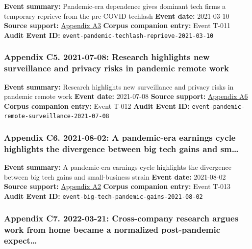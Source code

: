 \documentclass[
  american,
  11pt,
  letterpaper,
]{article}
\begin{document}
\textbf{Event summary:} Pandemic-era dependence gives dominant tech
firms a temporary reprieve from the pre-COVID techlash \textbf{Event
date:} 2021-03-10 \textbf{Source support:}
\hyperref[appendix-a3-pandemic-provides-a-techlash-reprieve]{Appendix
A3} \textbf{Corpus companion entry:} Event T-011 \textbf{Audit Event
ID:} \texttt{event-pandemic-techlash-reprieve-2021-03-10}

\subsubsection{Appendix C5. 2021-07-08: Research highlights new
surveillance and privacy risks in pandemic remote
work}\label{appendix-c5-2021-07-08-research-highlights-new-surveillance-and-privacy-risks-in-pandemic-remote-work}

\textbf{Event summary:} Research highlights new surveillance and privacy
risks in pandemic remote work \textbf{Event date:} 2021-07-08
\textbf{Source support:}
\hyperref[appendix-a6-remote-working-pre-and-post-covid-19-an-analysis-of-new-threats-and-risks-to-security-and-privacy]{Appendix
A6} \textbf{Corpus companion entry:} Event T-012 \textbf{Audit Event
ID:} \texttt{event-pandemic-remote-surveillance-2021-07-08}

\subsubsection{Appendix C6. 2021-08-02: A pandemic-era earnings cycle
highlights the divergence between big tech gains and
sm\ldots{}}\label{appendix-c6-2021-08-02-a-pandemic-era-earnings-cycle-highlights-the-divergence-between-big-tech-gains-and-small-business-strain}

\textbf{Event summary:} A pandemic-era earnings cycle highlights the
divergence between big tech gains and small-business strain
\textbf{Event date:} 2021-08-02 \textbf{Source support:}
\hyperref[appendix-a2-big-tech-announces-striking-pandemic-gains-as-small-businesses-strain-to-find-their-footing]{Appendix
A2} \textbf{Corpus companion entry:} Event T-013 \textbf{Audit Event
ID:} \texttt{event-big-tech-pandemic-gains-2021-08-02}

\subsubsection{Appendix C7. 2022-03-21: Cross-company research argues
work from home became a normalized post-pandemic
expect\ldots{}}\label{appendix-c7-2022-03-21-cross-company-research-argues-work-from-home-became-a-normalized-post-pandemic-expectation}
\end{document}
